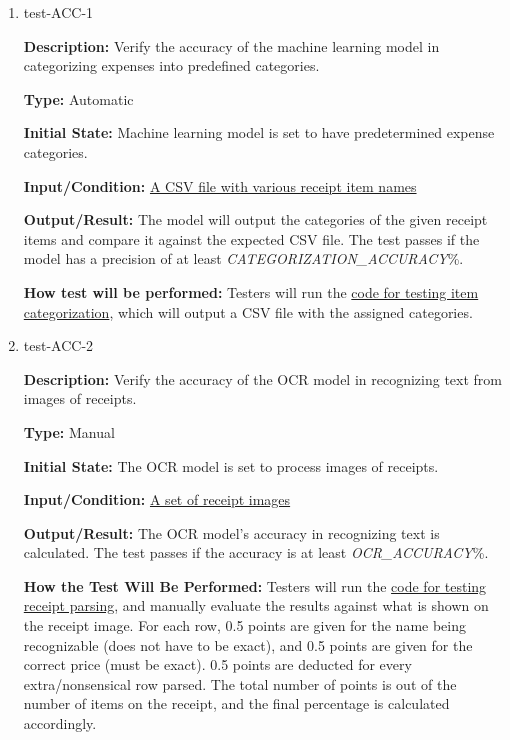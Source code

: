 \documentclass[12pt, titlepage]{article}
\begin{document}
\begin{enumerate}

\item{test-ACC-1\\}

\textbf{Description:} Verify the accuracy of the machine learning model in
categorizing expenses into predefined categories.

\textbf{Type:} Automatic
					
\textbf{Initial State:} Machine learning model is set to have predetermined
expense categories.
					
\textbf{Input/Condition:}
\href{https://github.com/PlutosCapstone/Plutos/tree/main/src/server/tests/imageProcessing/data/categorization/receipt_items_input.csv}{A
CSV file with various receipt item names}
					
\textbf{Output/Result:} The model will output the categories of the given
receipt items and compare it against the expected CSV file. The test passes if
the model has a precision of at least \textit{CATEGORIZATION\_ACCURACY}\%.
					
\textbf{How test will be performed:} Testers will run the
\href{https://github.com/PlutosCapstone/Plutos/tree/main/src/server/tests/imageProcessing/test_categorization.py}{code
for testing item categorization}, which will output a CSV file with the assigned
categories. 


\item{test-ACC-2\\}

\textbf{Description:} Verify the accuracy of the OCR model in recognizing text
from images of receipts.

\textbf{Type:} Manual
					
\textbf{Initial State:} The OCR model is set to process images of receipts.
					
\textbf{Input/Condition:}
\href{https://github.com/PlutosCapstone/Plutos/tree/main/src/server/tests/imageProcessing/data/parsing/input}{A
set of receipt images}
					
\textbf{Output/Result:} The OCR model's accuracy in recognizing text is
calculated. The test passes if the accuracy is at least
\textit{OCR\_ACCURACY}\%.
					
\textbf{How the Test Will Be Performed:} Testers will run the
\href{https://github.com/PlutosCapstone/Plutos/tree/main/src/server/tests/imageProcessing/test_parsing.py}{code
for testing receipt parsing}, and manually evaluate the results against what is
shown on the receipt image. For each row, 0.5 points are given for the name
being recognizable (does not have to be exact), and 0.5 points are given for the
correct price (must be exact). 0.5 points are deducted for every
extra/nonsensical row parsed. The total number of points is out of the number of
items on the receipt, and the final percentage is calculated accordingly. 




\end{enumerate}
\end{document}
